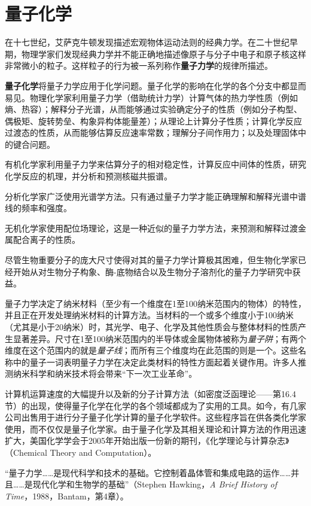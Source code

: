 \documentclass[12pt,a4paper,openany]{ctexbook}
\begin{document}
\section{量子化学}
\begin{flushleft}
    \setlength{\parindent}{2em}
在十七世纪，艾萨克牛顿发现描述宏观物体运动法则的经典力学。在二十世纪早期，物理学家们发现经典力学并不能正确地描述像原子与分子中电子和原子核这样非常微小的粒子。这样粒子的行为被一系列称作\textbf{量子力学}的规律所描述。

\textbf{量子化学}将量子力学应用于化学问题。量子化学的影响在化学的各个分支中都显而易见。物理化学家利用量子力学（借助统计力学）计算气体的热力学性质（例如熵、热容）；解释分子光谱，从而能够通过实验确定分子的性质（例如分子构型、偶极矩、旋转势垒、构象异构体能量差）；从理论上计算分子性质；计算化学反应过渡态的性质，从而能够估算反应速率常数；理解分子间作用力；以及处理固体中的键合问题。

有机化学家利用量子力学来估算分子的相对稳定性，计算反应中间体的性质，研究化学反应的机理，并分析和预测核磁共振谱。

分析化学家广泛使用光谱学方法。只有通过量子力学才能正确理解和解释光谱中谱线的频率和强度。

无机化学家使用配位场理论，这是一种近似的量子力学方法，来预测和解释过渡金属配合离子的性质。

尽管生物重要分子的庞大尺寸使得对其的量子力学计算极其困难，但生物化学家已经开始从对生物分子构象、酶-底物结合以及生物分子溶剂化的量子力学研究中获益。

量子力学决定了纳米材料（至少有一个维度在1至100纳米范围内的物体）的特性，并且正在开发处理纳米材料的计算方法。当材料的一个或多个维度小于100纳米（尤其是小于20纳米）时，其光学、电子、化学及其他性质会与整体材料的性质产生显著差异。尺寸在1至100纳米范围内的半导体或金属物体被称为\textit{量子阱}；有两个维度在这个范围内的就是\textit{量子线}；而所有三个维度均在此范围的则是一个。这些名称中的量子一词表明量子力学在决定此类材料的特性方面起着关键作用。许多人推测纳米科学和纳米技术将会带来“下一次工业革命”。

计算机运算速度的大幅提升以及新的分子计算方法（如密度泛函理论——第16.4节）的出现，使得量子化学在化学的各个领域都成为了实用的工具。如今，有几家公司出售用于进行分子量子化学计算的量子化学软件。这些程序旨在供各类化学家使用，而不仅仅是量子化学家。由于量子化学及其相关理论和计算方法的作用迅速扩大，美国化学学会于2005年开始出版一份新的期刊，《化学理论与计算杂志》（Chemical Theory and Computation）。 

“量子力学……是现代科学和技术的基础。它控制着晶体管和集成电路的运作……并且……是现代化学和生物学的基础”（Stephen Hawking，\textit{A Brief History of Time}，1988，Bantam，第4章）。
\end{flushleft}
\end{document}
